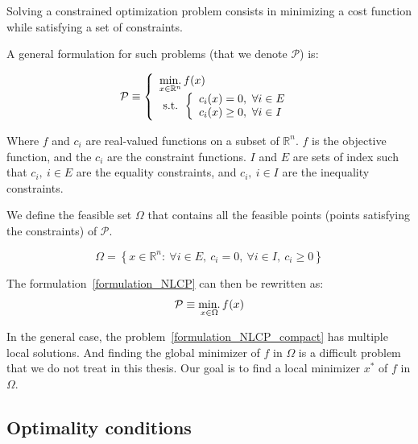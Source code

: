 Solving a constrained optimization problem consists in minimizing a cost function while satisfying a set of constraints.

A general formulation for such problems (that we denote $\mathcal{P}$) is:

\begin{equation}
  \label{formulation_NLCP}
  \mathcal{P} \equiv
  \left\{
  \begin{array}{l}
    \operatorname*{min.}\limits_{x\in\mathbb{R}^n}{f(x)}\\
    \text{ s.t. }
    \left\{
    \begin{array}{l}
      c_i(x) = 0,\ \forall i\in{E}\\
      c_i(x) \geq 0,\ \forall i\in{I}\\
    \end{array}
    \right.
  \end{array}
  \right.
\end{equation}

Where $f$ and $c_i$ are real-valued functions on a subset of $\mathbb{R}^n$.
$f$ is the objective function, and the $c_i$ are the constraint functions.
${I}$ and ${E}$ are sets of index such that $c_i,\ i\in{E}$ are the equality constraints, and $c_i,\ i\in{I}$ are the inequality constraints.

We define the feasible set $\Omega$ that contains all the feasible points (points satisfying the constraints) of $\mathcal{P}$.

\begin{equation}
  \Omega = \left\{ x\in \mathbb{R}^n:\ \forall i\in {E},\ c_i=0,\ \forall i\in{I},\ c_i \geq0\right\}
\end{equation}

The formulation~\ref{formulation_NLCP} can then be rewritten as:
\begin{equation}
  \label{formulation_NLCP_compact}
  \mathcal{P} \equiv \operatorname*{min.}_{x\in\Omega}{f(x)}
\end{equation}

In the general case, the problem~\ref{formulation_NLCP_compact} has multiple local solutions.
And finding the global minimizer of $f$ in $\Omega$ is a difficult problem that we do not treat in this thesis.
Our goal is to find a local minimizer $x^*$ of $f$ in $\Omega$.

\subsection{Optimality conditions}
\label{sub:optimality_conditions}

